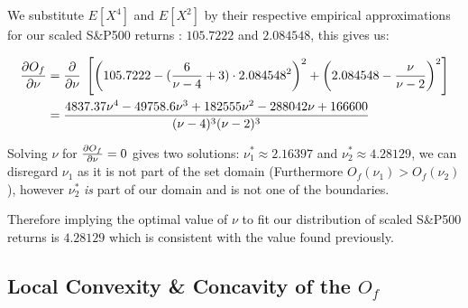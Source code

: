 We substitute $E\left[X^4\right]$ and $E\left[X^2\right]$ by their respective empirical approximations for our scaled S\&P500 returns : $105.7222$ and $2.084548$, this gives us:

\begin{align}\label{FirstDerivativeOf_Of_I}
    \begin{split}
        \pdv{O_f}{\nu} &= \pdv{\nu} \; \left[ \left(105.7222 - (\frac{6}{\nu-4} + 3) \cdot
                            2.084548^2 \right)^2 + \left(2.084548 - \frac{\nu}{\nu - 2}\right)^2 \right] \\
                        &= \frac{4837.37 \nu^4 - 49758.6 \nu^3 + 182555 \nu^2 - 288042 \nu + 166600}{(\nu - 4)^3 (\nu - 2)^3}
    \end{split}
\end{align}

Solving $\nu$ for  $\pdv{O_f}{\nu}=0$ gives two solutions: $\nu_1^* \approx 2.16397$ and $\nu_2^* \approx 4.28129$, we can disregard $\nu_1$ as it is not part of the set domain (Furthermore $O_f(\nu_1) > O_f(\nu_2)$), however $\nu_2^*$ \emph{is} part of our domain and is not one of the boundaries. \smallskip
\par
Therefore implying the optimal value of $\nu$ to fit our distribution of scaled S\&P500 returns is $4.28129$ which is consistent with the value found previously.

\subsection{Local Convexity \& Concavity of the $O_f$}

